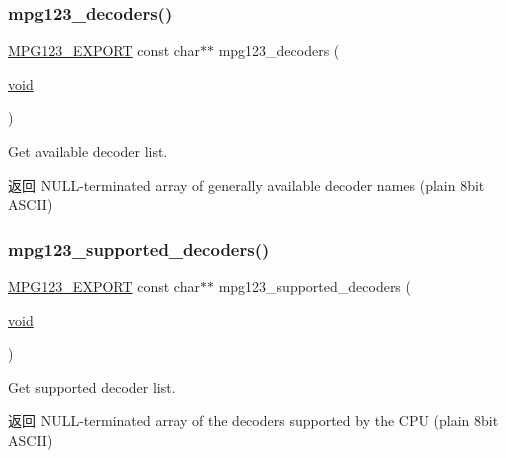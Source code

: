 \subsubsection{\texorpdfstring{mpg123\+\_\+decoders()}{mpg123\_decoders()}}
{\footnotesize\ttfamily \hyperlink{mpg123_8h_a2ba98cfba3f760879df70e755b2a61cc}{M\+P\+G123\+\_\+\+E\+X\+P\+O\+RT} const char$\ast$$\ast$ mpg123\+\_\+decoders (\begin{DoxyParamCaption}\item[{\hyperlink{interfacevoid}{void}}]{ }\end{DoxyParamCaption})}

Get available decoder list. \begin{DoxyReturn}{返回}
N\+U\+L\+L-\/terminated array of generally available decoder names (plain 8bit A\+S\+C\+II) 
\end{DoxyReturn}
\mbox{\label{group__mpg123__decoder_gaa74de136a5a49d0b420707e98e91a789}} 
\subsubsection{\texorpdfstring{mpg123\+\_\+supported\+\_\+decoders()}{mpg123\_supported\_decoders()}}
{\footnotesize\ttfamily \hyperlink{mpg123_8h_a2ba98cfba3f760879df70e755b2a61cc}{M\+P\+G123\+\_\+\+E\+X\+P\+O\+RT} const char$\ast$$\ast$ mpg123\+\_\+supported\+\_\+decoders (\begin{DoxyParamCaption}\item[{\hyperlink{interfacevoid}{void}}]{ }\end{DoxyParamCaption})}

Get supported decoder list. \begin{DoxyReturn}{返回}
N\+U\+L\+L-\/terminated array of the decoders supported by the C\+PU (plain 8bit A\+S\+C\+II) 
\end{DoxyReturn}
